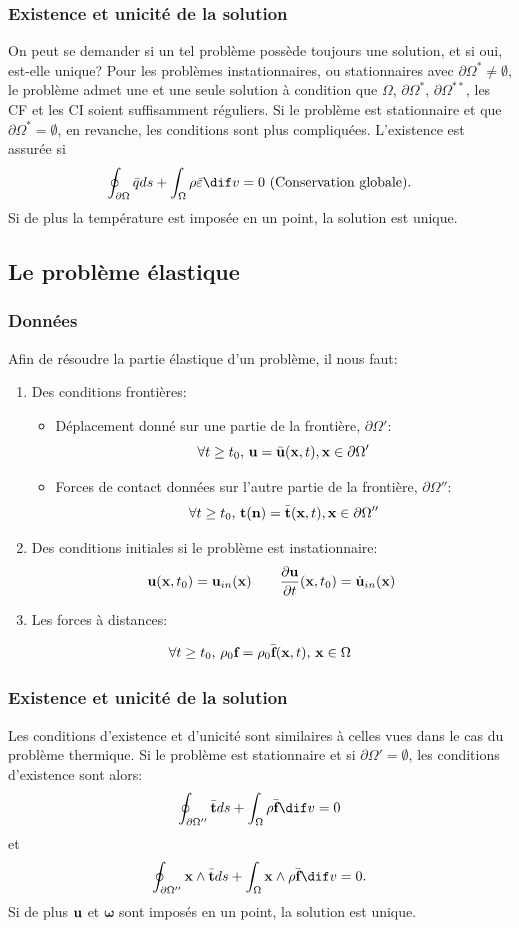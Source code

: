 \subsubsection*{Existence et unicité de la solution}
On peut se demander si un tel problème possède toujours une solution, et si oui, est-elle unique? Pour les problèmes instationnaires, ou stationnaires avec $\partial\Omega^*\neq \emptyset$, le problème admet une et une seule solution à condition que $\Omega$, $\partial\Omega^*$, $\partial\Omega^{**}$, les CF et les CI soient suffisamment réguliers. Si le problème est stationnaire et que $\partial\Omega^*=\emptyset$, en revanche, les conditions sont plus compliquées. L'existence est assurée si
$$\oint_{\partial\Omega}\bar{q}ds+\int_{\Omega}\rho\bar{\varepsilon} \dif v=0\text{  (Conservation globale)}.$$
Si de plus la température est imposée en un point, la solution est unique.

\subsection{Le problème élastique}
\subsubsection*{Données}
Afin de résoudre la partie élastique d'un problème, il nous faut:
\begin{enumerate}
\item Des conditions frontières:
	\begin{itemize}
	\item Déplacement donné sur une partie de la frontière, $\partial\Omega'$:
	 $$\forall t\geq t_0,\, \textbf{u}=\bar{\textbf{u}}(\textbf{x},t), \textbf{x}\in\partial\Omega'$$
	\item Forces de contact données sur l'autre partie de la frontière, $\partial\Omega''$:
	 $$\forall t\geq t_0,\, \textbf{t}(\textbf{n})=\bar{\textbf{t}}(\textbf{x},t), \textbf{x}\in\partial\Omega''$$
	\end{itemize}
\item Des conditions initiales si le problème est instationnaire: $$\textbf{u}(\textbf{x},t_0)=\textbf{u}_{in}(\textbf{x})\qquad \frac{\partial\textbf{u}}{\partial t}(\textbf{x},t_0)=\dot{\textbf{u}}_{in}(\textbf{x})$$
\item Les forces à distances:
\end{enumerate}
$$\forall t \geq t_0,\, \rho_0\textbf{f}=\rho_0\bar{\textbf{f}}(\textbf{x},t),\,\textbf{x}\in\Omega$$
\subsubsection*{Existence et unicité de la solution}
Les conditions d'existence et d'unicité sont similaires à celles vues dans le cas du problème thermique. Si le problème est stationnaire et si $\partial\Omega'=\emptyset$, les conditions d'existence sont alors:
$$\oint_{\partial\Omega''}\bar{\fv{t}}ds+\int_{\Omega}\rho\bar{\fv{f}} \dif v=0$$
et
$$\oint_{\partial\Omega''}\fv{x}\wedge\bar{\fv{t}}ds+\int_{\Omega}\fv{x}\wedge\rho\bar{\fv{f}} \dif v=0.$$Si de plus $\textbf{u}$ et $\boldsymbol{\omega}$ sont imposés en un point, la solution est unique.
